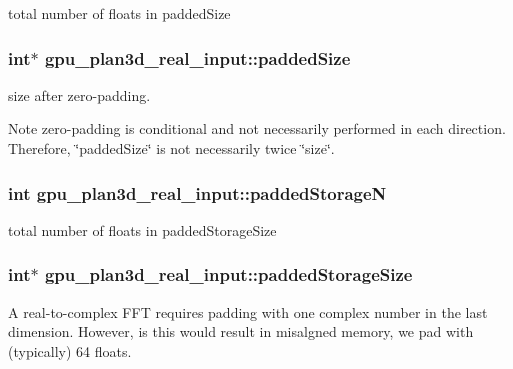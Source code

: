 total number of floats in paddedSize 

\hypertarget{structgpu__plan3d__real__input_a3542f2b6fca17ea54549c784570dcd44}{
\subsubsection[{paddedSize}]{\setlength{\rightskip}{0pt plus 5cm}int$\ast$ {\bf gpu\_\-plan3d\_\-real\_\-input::paddedSize}}}
\label{structgpu__plan3d__real__input_a3542f2b6fca17ea54549c784570dcd44}


size after zero-\/padding. 

\begin{DoxyNote}{Note}
zero-\/padding is conditional and not necessarily performed in each direction. Therefore, \char`\"{}paddedSize\char`\"{} is not necessarily twice \char`\"{}size\char`\"{}. 
\end{DoxyNote}
\hypertarget{structgpu__plan3d__real__input_ac2ab3705948b428a3db89126c7610964}{
\subsubsection[{paddedStorageN}]{\setlength{\rightskip}{0pt plus 5cm}int {\bf gpu\_\-plan3d\_\-real\_\-input::paddedStorageN}}}
\label{structgpu__plan3d__real__input_ac2ab3705948b428a3db89126c7610964}


total number of floats in paddedStorageSize 

\hypertarget{structgpu__plan3d__real__input_a46e1d58faf582ea23c2e3e14640356b2}{
\subsubsection[{paddedStorageSize}]{\setlength{\rightskip}{0pt plus 5cm}int$\ast$ {\bf gpu\_\-plan3d\_\-real\_\-input::paddedStorageSize}}}
\label{structgpu__plan3d__real__input_a46e1d58faf582ea23c2e3e14640356b2}


A real-\/to-\/complex FFT requires padding with one complex number in the last dimension. However, is this would result in misalgned memory, we pad with (typically) 64 floats. 

